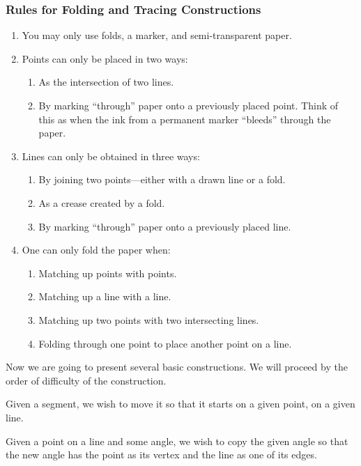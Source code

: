 \subsubsection*{Rules for Folding and Tracing Constructions}
\begin{enumerate}
\item You may only use folds, a marker, and semi-transparent paper.
\item Points can only be placed in two ways:
\begin{enumerate}
\item As the intersection of two lines. 
\item By marking ``through'' paper onto a previously placed
  point. Think of this as when the ink from a permanent marker
  ``bleeds'' through the paper.
\end{enumerate}
\item Lines can only be obtained in three ways:
\begin{enumerate}
\item By joining two points---either with a drawn line or a fold.
\item As a crease created by a fold. 
\item By marking ``through'' paper onto a previously placed
  line.
\end{enumerate}
\item One can only fold the paper when:
\begin{enumerate}
\item Matching up points with points.
\item Matching up a line with a line.
\item Matching up two points with two intersecting lines.
\item Folding through one point to place another point on a line.
\end{enumerate}
\end{enumerate}


Now we are going to present several basic constructions. We will
proceed by the order of difficulty of the construction.


\begin{con}  
Given a segment, we wish to move it so that it starts on a given
point, on a given line.
\end{con}


\begin{con} 
Given a point on a line and some angle, we wish to copy the given
angle so that the new angle has the point as its vertex and the line
as one of its edges.
\end{con}

